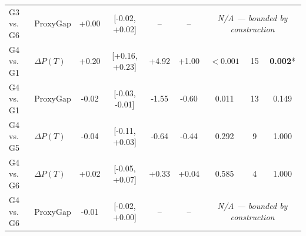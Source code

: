 \begin{table}[t]
\begin{tabular}{llccccccc}
G3 vs. G6 & $\text{ProxyGap}$ & +0.00 & [-0.02, +0.02] & -- & -- & \multicolumn{3}{c}{\textit{N/A --- bounded by construction}} \\
G4 vs. G1 & $\Delta P(T)$ & +0.20 & [+0.16, +0.23] & +4.92 & +1.00 & $<0.001$ & 15 & \textbf{0.002}* \\
G4 vs. G1 & $\text{ProxyGap}$ & -0.02 & [-0.03, -0.01] & -1.55 & -0.60 & 0.011 & 13 & 0.149 \\
G4 vs. G5 & $\Delta P(T)$ & -0.04 & [-0.11, +0.03] & -0.64 & -0.44 & 0.292 & 9 & 1.000 \\
G4 vs. G6 & $\Delta P(T)$ & +0.02 & [-0.05, +0.07] & +0.33 & +0.04 & 0.585 & 4 & 1.000 \\
G4 vs. G6 & $\text{ProxyGap}$ & -0.01 & [-0.02, +0.00] & -- & -- & \multicolumn{3}{c}{\textit{N/A --- bounded by construction}} \\
\bottomrule
\end{tabular}
\end{table}
